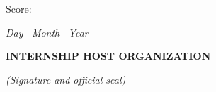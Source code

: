 \documentclass[13pt,a4paper]{extreport}
\begin{document}
{\fontsize{13pt}{17pt}\selectfont

\internshipdotline
\vspace{0.32cm}

\internshipdotline
\vspace{0.32cm}

\internshipdotline
\vspace{0.32cm}

\internshipdotline
\vspace{0.32cm}

\internshipdotline
\vspace{0.32cm}

\internshipdotline
\vspace{0.32cm}

\internshipdotline
\vspace{0.32cm}

\internshipdotline
\vspace{0.32cm}

\internshipdotline
\vspace{0.32cm}

\internshipdotline
\vspace{0.32cm}

\internshipdotline
\vspace{0.32cm}

\internshipdotline

}

\vspace{0.6cm}


{\fontsize{14pt}{18pt}\selectfont

\noindent
\hspace{0.8cm}
Score:
\makebox[3.0cm][l]{\dotfill}

}

\vspace{1.5cm}


\begin{flushright}

\begin{minipage}{7.5cm}
    \centering

    {\fontsize{13pt}{17pt}\selectfont\itshape
    Day \makebox[0.8cm][l]{\dotfill}\,
    Month \makebox[0.8cm][l]{\dotfill}\,
    Year \the\year
    }

    \vspace{0.35cm}

    {\fontsize{14pt}{18pt}\selectfont\bfseries
    INTERNSHIP HOST ORGANIZATION}

    \vspace{0.15cm}

    {\fontsize{13pt}{17pt}\selectfont\itshape
    (Signature and official seal)}

\end{minipage}

\end{flushright}
\clearpage
\end{document}

